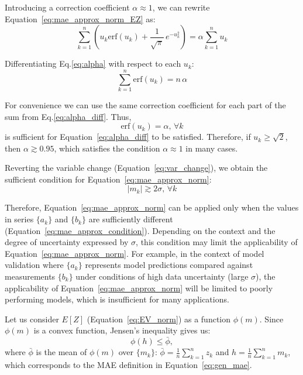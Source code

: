 \documentclass[12pt,a4paper]{article}
\theoremstyle{definition}
\begin{document}
Introducing a correction coefficient $\alpha \approx 1$, we can rewrite Equation~\ref{eq:mae_approx_norm_EZ} as:
\begin{equation}
	\sum\limits_{k=1}^{n} \left( u_k \mathrm{erf}(u_k) + \frac{1}{\sqrt{\pi}}\,e^{-u_k^2} \right) = \alpha \sum\limits_{k=1}^{n} u_k
	\label{eq:alpha}
\end{equation}

Differentiating Eq.\ref{eq:alpha} with respect to each $u_k$:
\begin{equation}
	\sum\limits_{k=1}^{n} \mathrm{erf}(u_k) = n\,\alpha
	\label{eq:alpha_diff}
\end{equation}

For convenience we can use the same correction coefficient for each part of the sum from Eq.\ref{eq:alpha_diff}. Thus,  
\begin{equation}
	\mathrm{erf}(u_k) = \alpha,\,\forall k
	\label{eq:alpha_095}
\end{equation}
is sufficient for Equation~\ref{eq:alpha_diff} to be satisfied. Therefore, if $u_k \geq \sqrt{2}$, then $\alpha \gtrsim 0.95$, which satisfies the condition $\alpha \approx 1$ in many cases.

Reverting the variable change (Equation~\ref{eq:var_change}), we obtain the sufficient condition for Equation~\ref{eq:mae_approx_norm}:
\begin{equation}
	|m_k| \gtrsim  2\sigma, \, \forall k
	\label{eq:mae_approx_condition}
\end{equation}

Therefore, Equation~\ref{eq:mae_approx_norm} can be applied only when the values in series $\{a_k\}$ and $\{b_k\}$ are sufficiently different (Equation~\ref{eq:mae_approx_condition}). Depending on the context and the degree of uncertainty expressed by $\sigma$, this condition may limit the applicability of Equation~\ref{eq:mae_approx_norm}. For example, in the context of model validation where $\{a_k\}$ represents model predictions compared against measurements $\{b_k\}$ under conditions of high data uncertainty (large $\sigma$), the applicability of Equation~\ref{eq:mae_approx_norm} will be limited to poorly performing models, which is insufficient for many applications.

Let us consider $E[Z]$ (Equation~\ref{eq:EV_norm}) as a function $\phi(m)$. Since $\phi(m)$ is a convex function, Jensen's inequality gives us:
\begin{equation}
	\phi(h) \leq \bar{\phi},
	\label{eq:ineq_jensen}
\end{equation}
where $\bar\phi$ is the mean of $\phi(m)$ over $\{m_k\}$: $\bar\phi = \frac{1}{n} \sum\limits_{k=1}^{n} z_k$ and $h = \frac{1}{n} \sum\limits_{k=1}^{n} m_k$, which corresponds to the MAE definition in Equation~\ref{eq:gen_mae}.
\end{document}

